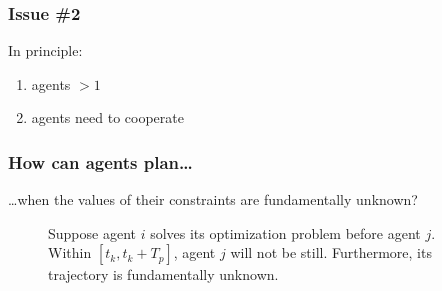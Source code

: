 \begin{frame} %
  \frametitle{Issue \#2}

  In principle:\\[4ex]

  \begin{enumerate}
    \item agents $> 1$
    \item agents need to cooperate
  \end{enumerate}
\end{frame} %
\begin{frame} %
  \frametitle{How can agents plan\dots}
 \dots when the values of their constraints are fundamentally unknown?
\begin{figure}[ht!]
  \centering
  
  \caption{Suppose agent $i$ solves its optimization problem before agent $j$.
    Within $[t_k, t_k + T_p]$, agent $j$ will not be still. Furthermore, its
    trajectory is fundamentally unknown.}
  \label{fig:constraint_regime_horizon_intro}
\end{figure}
\end{frame} %
